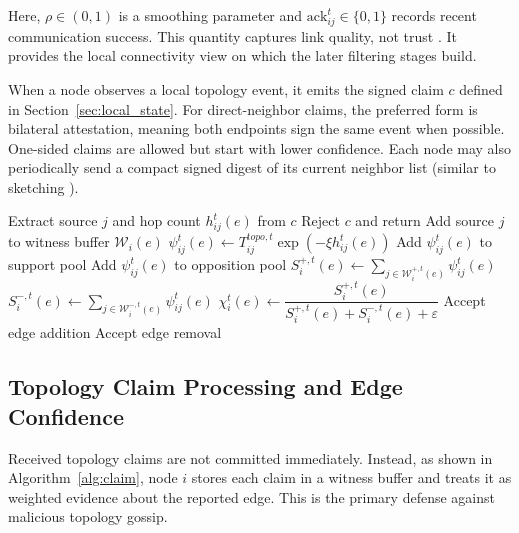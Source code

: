 \documentclass[journal]{IEEEtran}
\theoremstyle{definition}
\theoremstyle{remark}
\begin{document}
Here, $\rho \in (0,1)$ is a smoothing parameter and $\text{ack}_{ij}^{t} \in \{0,1\}$ records recent communication success. This quantity captures link quality, not trust \cite{ye2022decentralized}. It provides the local connectivity view on which the later filtering stages build.

When a node observes a local topology event, it emits the signed claim $c$ defined in Section~\ref{sec:local_state}. For direct-neighbor claims, the preferred form is bilateral attestation, meaning both endpoints sign the same event when possible. One-sided claims are allowed but start with lower confidence. Each node may also periodically send a compact signed digest of its current neighbor list (similar to sketching \cite{rangwala2025sketchguard}).

\begin{algorithm}[t]
\caption{Topology claim processing and edge-confidence update}
\label{alg:claim}
\begin{algorithmic}[1]
\State Extract source $j$ and hop count $h_{ij}^t(e)$ from $c$
    \State Reject $c$ and return
\EndIf
\State Add source $j$ to witness buffer $\mathcal{W}_i(e)$
\State $\psi_{ij}^t(e) \gets T_{ij}^{topo,t}\exp(-\xi h_{ij}^t(e))$
    \State Add $\psi_{ij}^t(e)$ to support pool
\Else
    \State Add $\psi_{ij}^t(e)$ to opposition pool
\EndIf
\State $S_i^{+,t}(e) \gets \sum_{j \in \mathcal{W}_i^{+,t}(e)} \psi_{ij}^t(e)$
\State $S_i^{-,t}(e) \gets \sum_{j \in \mathcal{W}_i^{-,t}(e)} \psi_{ij}^t(e)$
\State $\chi_i^t(e) \gets \dfrac{S_i^{+,t}(e)}{S_i^{+,t}(e)+S_i^{-,t}(e)+\varepsilon}$
        \State Accept edge addition
    \EndIf
\Else
        \State Accept edge removal
    \EndIf
\EndIf
\end{algorithmic}
\end{algorithm}

\subsection{Topology Claim Processing and Edge Confidence}

Received topology claims are not committed immediately. Instead, as shown in Algorithm~\ref{alg:claim}, node $i$ stores each claim in a witness buffer and treats it as weighted evidence about the reported edge. This is the primary defense against malicious topology gossip.
\end{document}
